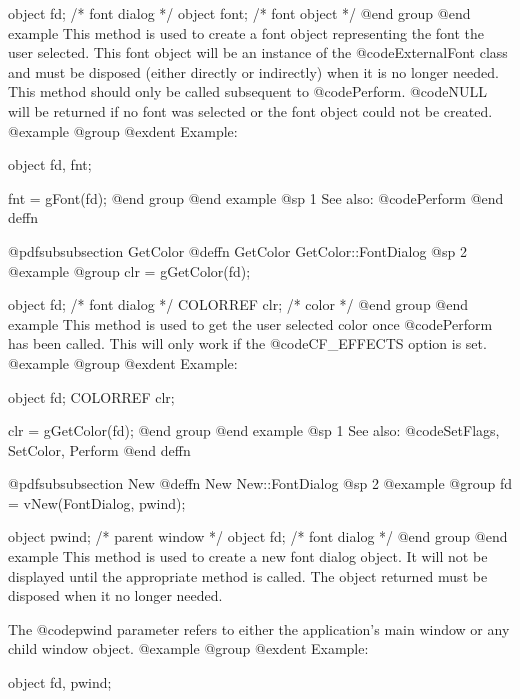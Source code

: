 object  fd;     /*  font dialog  */
object  font;   /*  font object  */
@end group
@end example
This method is used to create a font object representing the font the
user selected.  This font object will be an instance of the
@code{ExternalFont} class and must be disposed (either directly or
indirectly) when it is no longer needed.  This method should only
be called subsequent to @code{Perform}.  @code{NULL} will be returned
if no font was selected or the font object could not be created.
@example
@group
@exdent Example:

object  fd, fnt;

fnt = gFont(fd);
@end group
@end example
@sp 1
See also:  @code{Perform}
@end deffn











@pdfsubsubsection {GetColor}
@deffn {GetColor} GetColor::FontDialog
@sp 2
@example
@group
clr = gGetColor(fd);

object   fd;    /*  font dialog  */
COLORREF clr;   /*  color        */
@end group
@end example
This method is used to get the user selected color once @code{Perform}
has been called.  This will only work if the @code{CF_EFFECTS} option
is set.
@example
@group
@exdent Example:

object  fd;
COLORREF clr;

clr = gGetColor(fd);
@end group
@end example
@sp 1
See also:  @code{SetFlags, SetColor, Perform}
@end deffn














@pdfsubsubsection {New}
@deffn {New} New::FontDialog
@sp 2
@example
@group
fd = vNew(FontDialog, pwind);

object  pwind;  /*  parent window  */
object  fd;     /*  font dialog    */
@end group
@end example
This method is used to create a new font dialog object.  It will not be
displayed until the appropriate method is called.  The object returned
must be disposed when it no longer needed.

The @code{pwind} parameter refers to either the application's main window
or any child window object.
@example
@group
@exdent Example:

object  fd, pwind;

